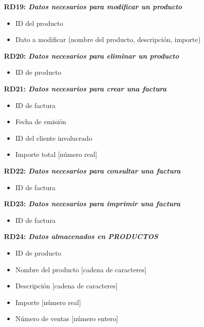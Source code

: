 \documentclass[paper=a4, fontsize=11pt, spanish]{scrartcl}
\begin{document}
	\setlength{\parindent}{0em}
	\textbf{RD19: \textit{Datos necesarios para modificar un producto}}
	\setlength{\parindent}{2em}
	\begin{itemize}
		\item ID del producto
		\item Dato a modificar (nombre del producto, descripción, importe)
	\end{itemize}
	
	\setlength{\parindent}{0em}
	\textbf{RD20: \textit{Datos necesarios para eliminar un producto}}
	\setlength{\parindent}{2em}
	\begin{itemize}
		\item ID de producto
	\end{itemize}
	
	\setlength{\parindent}{0em}
	\textbf{RD21: \textit{Datos necesarios para crear una factura}}
	\setlength{\parindent}{2em}
	\begin{itemize}
		\item ID de factura
		\item Fecha de emisión 
		\item ID del cliente involucrado
		\item Importe total [número real]
	\end{itemize}
	
	\setlength{\parindent}{0em}
	\textbf{RD22: \textit{Datos necesarios para consultar una factura}}
	\setlength{\parindent}{2em}
	\begin{itemize}
		\item ID de factura
	\end{itemize}
	
	\setlength{\parindent}{0em}
	\textbf{RD23: \textit{Datos necesarios para imprimir una factura}}
	\setlength{\parindent}{2em}
	\begin{itemize}
		\item ID de factura
	\end{itemize}
	
	\setlength{\parindent}{0em}
	\textbf{RD24: \textit{Datos almacenados en PRODUCTOS}}
	\setlength{\parindent}{2em}
	\begin{itemize}
		\item ID de producto
		\item Nombre del producto [cadena de caracteres]
		\item Descripción [cadena de caracteres]
		\item Importe [número real]
		\item Número de ventas [número entero]
	\end{itemize}
	
\end{document}
